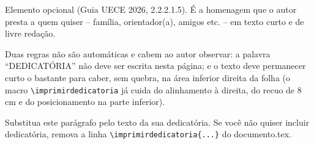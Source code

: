 Elemento opcional (Guia UECE 2026, 2.2.2.1.5). É a homenagem que o autor presta a quem quiser -- família, orientador(a), amigos etc. -- em texto curto e de livre redação.

Duas regras não são automáticas e cabem ao autor observar: a palavra ``DEDICATÓRIA'' não deve ser escrita nesta página; e o texto deve permanecer curto o bastante para caber, sem quebra, na área inferior direita da folha (o macro \texttt{\textbackslash imprimirdedicatoria} já cuida do alinhamento à direita, do recuo de 8 cm e do posicionamento na parte inferior).

Substitua este parágrafo pelo texto da sua dedicatória. Se você não quiser incluir dedicatória, remova a linha \texttt{\textbackslash imprimirdedicatoria\{...\}} do documento.tex.
